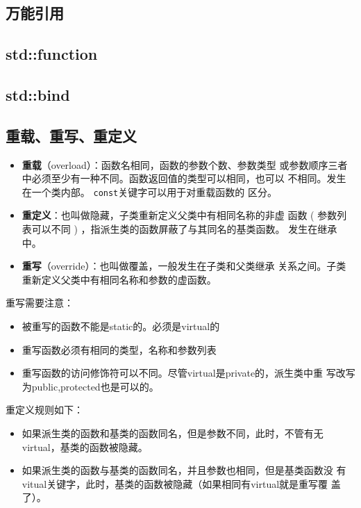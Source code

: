 \subsection{万能引用}

\subsection{std::function}
\label{sec:function}


\subsection{std::bind}
\label{sec:bind}

 

\subsection{重载、重写、重定义}
\label{sec:Overload}
\begin{itemize}
\item \textbf{重载}（overload）：函数名相同，函数的参数个数、参数类型
  或参数顺序三者中必须至少有一种不同。函数返回值的类型可以相同，也可以
  不相同。发生在一个类内部。 \texttt{const}关键字可以用于对重载函数的
  区分。 
\item \textbf{重定义}：也叫做隐藏，子类重新定义父类中有相同名称的非虚
  函数 ( 参数列表可以不同 ) ，指派生类的函数屏蔽了与其同名的基类函数。
  发生在继承中。 
\item \textbf{重写}（override）：也叫做覆盖，一般发生在子类和父类继承
  关系之间。子类重新定义父类中有相同名称和参数的虚函数。
\end{itemize}

重写需要注意：
\begin{itemize}
\item 被重写的函数不能是static的。必须是virtual的
\item 重写函数必须有相同的类型，名称和参数列表
\item 重写函数的访问修饰符可以不同。尽管virtual是private的，派生类中重
  写改写为public,protected也是可以的。
\end{itemize}

重定义规则如下：
\begin{itemize}
\item 如果派生类的函数和基类的函数同名，但是参数不同，此时，不管有无
  virtual，基类的函数被隐藏。
\item 如果派生类的函数与基类的函数同名，并且参数也相同，但是基类函数没
  有vitual关键字，此时，基类的函数被隐藏（如果相同有virtual就是重写覆
  盖了）。 
\end{itemize}

